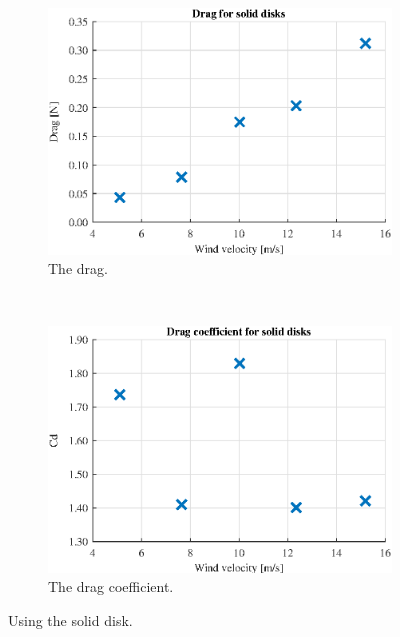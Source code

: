 \begin{figure} [h!]
    \centering
    \begin{subfigure}[b]{0.45\linewidth}
        \includegraphics[width=\textwidth]{0_Images/SolidDrag.eps}
        \caption{The drag.}
        \label{Fig:SolidDrag}
    \end{subfigure}
    ~
    \begin{subfigure}[b]{0.45\linewidth}
        \includegraphics[width=\textwidth]{0_Images/SolidCD.eps}
        \caption{The drag coefficient.}
        \label{Fig:SolidCD}
    \end{subfigure}
    \caption{Using the solid disk.}
    \label{fig:SolidDisk}
\end{figure}


